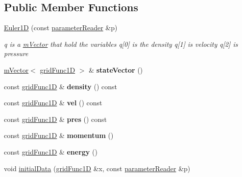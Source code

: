 \subsection*{Public Member Functions}
\begin{DoxyCompactItemize}
\item 
\mbox{\label{classEuler1D_ad84569261342179e02254ea816ee15c0}} 
\hyperlink{classEuler1D_ad84569261342179e02254ea816ee15c0}{Euler1D} (const \hyperlink{classparameterReader}{parameter\+Reader} \&p)
\begin{DoxyCompactList}\small\item\em q is a \hyperlink{classmVector}{m\+Vector} that hold the variables q\mbox{[}0\mbox{]} is the density q\mbox{[}1\mbox{]} is velocity q\mbox{[}2\mbox{]} is pressure \end{DoxyCompactList}\item 
\mbox{\label{classEuler1D_ad1612560c24dc0bb0aa54b2bc65bfade}} 
\hyperlink{classmVector}{m\+Vector}$<$ \hyperlink{classgridFunc1D}{grid\+Func1D} $>$ \& {\bfseries state\+Vector} ()
\item 
\mbox{\label{classEuler1D_a939370b2721b7ac97053e4ea95ee5cb9}} 
const \hyperlink{classgridFunc1D}{grid\+Func1D} \& {\bfseries density} () const
\item 
\mbox{\label{classEuler1D_ae81f6e2348124ef702a9257ae512a750}} 
const \hyperlink{classgridFunc1D}{grid\+Func1D} \& {\bfseries vel} () const
\item 
\mbox{\label{classEuler1D_a9046ccec8f4ecc822c260dfd3050ceb8}} 
const \hyperlink{classgridFunc1D}{grid\+Func1D} \& {\bfseries pres} () const
\item 
\mbox{\label{classEuler1D_a146d711f6675812bfec8dbc791503753}} 
const \hyperlink{classgridFunc1D}{grid\+Func1D} \& {\bfseries momentum} ()
\item 
\mbox{\label{classEuler1D_aa4d4e90fbf535fe877a87695d45555d4}} 
const \hyperlink{classgridFunc1D}{grid\+Func1D} \& {\bfseries energy} ()
\item 
\mbox{\label{classEuler1D_aea503a1e62ad484ca74b04da1b4c9300}} 
void \hyperlink{classEuler1D_aea503a1e62ad484ca74b04da1b4c9300}{initial\+Data} (\hyperlink{classgridFunc1D}{grid\+Func1D} \&x, const \hyperlink{classparameterReader}{parameter\+Reader} \&p)

\end{DoxyCompactItemize}
